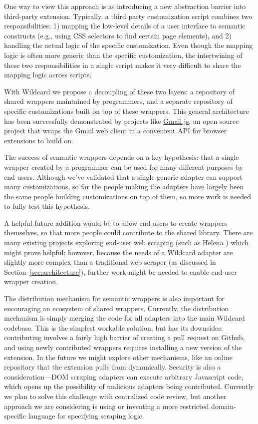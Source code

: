 \documentclass[sigplan,screen,10pt,anonymous,review]{acmart}
\begin{document}
One way to view this approach is as introducing a new abstraction
barrier into third-party extension. Typically, a third party
customization script combines two responsibilities: 1) mapping the
low-level details of a user interface to semantic constructs (e.g.,
using CSS selectors to find certain page elements), and 2) handling the
actual logic of the specific customization. Even though the mapping
logic is often more generic than the specific customization, the
intertwining of these two responsibilities in a single script makes it
very difficult to share the mapping logic across scripts.

With Wildcard we propose a decoupling of these two layers: a repository
of shared wrappers maintained by programmers, and a separate repository
of specific customizations built on top of these wrappers. This general
architecture has been successfully demonstrated by projects like
\href{https://github.com/KartikTalwar/gmail.js/}{Gmail.js}, an open
source project that wraps the Gmail web client in a convenient API for
browser extensions to build on.

The success of semantic wrappers depends on a key hypothesis: that a
single wrapper created by a programmer can be used for many different
purposes by end users. Although we've validated that a single generic
adapter can support many customizations, so far the people making the
adapters have largely been the same people building customizations on
top of them, so more work is needed to fully test this hypothesis.

A helpful future addition would be to allow end users to create wrappers
themselves, so that more people could contribute to the shared library.
There are many existing projects exploring end-user web scraping (such
as Helena \citep{chasins2018}) which might prove helpful; however,
because the needs of a Wildcard adapter are slightly more complex than a
traditional web scraper (as discussed in
Section~\ref{sec:architecture}), further work might be needed to enable
end-user wrapper creation.

The distribution mechanism for semantic wrappers is also important for
encouraging an ecosystem of shared wrappers. Currently, the distribution
mechanism is simply merging the code for all adapters into the main
Wildcard codebase. This is the simplest workable solution, but has its
downsides: contributing involves a fairly high barrier of creating a
pull request on Github, and using newly contributed wrappers requires
installing a new version of the extension. In the future we might
explore other mechanisms, like an online repository that the extension
pulls from dynamically. Security is also a consideration---DOM scraping
adapters can execute arbitrary Javascript code, which opens up the
possibility of malicious adapters being contributed. Currently we plan
to solve this challenge with centralized code review, but another
approach we are considering is using or inventing a more restricted
domain-specific language for specifying scraping logic.
\end{document}

